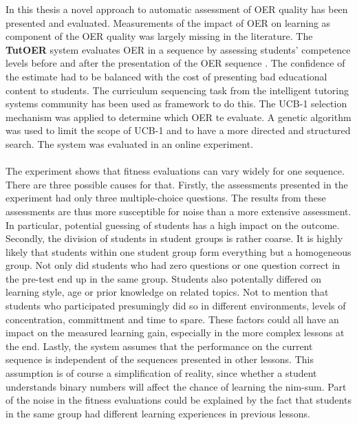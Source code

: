 In this thesis a novel approach to automatic assessment of OER quality has been
presented and evaluated. Measurements of the impact of OER on learning as
component of the OER quality was largely missing in the literature. The
\textbf{TutOER} system evaluates OER in a sequence by assessing students' competence levels
before and after the presentation of the OER sequence . The confidence of the estimate
had to be balanced with the cost of presenting bad educational content to
students. The curriculum sequencing task from the intelligent tutoring systems
community has been used as framework to do this. The UCB-1 selection mechanism
was applied to determine which OER te evaluate. A genetic algorithm was used
to limit the scope of UCB-1 and to have a more directed and structured
search. The system was evaluated in an online experiment.\\\\
\noindent
The experiment shows that fitness evaluations can vary widely for one
sequence. There are three possible causes for that. Firstly, the assessments
presented in the experiment had only three multiple-choice questions. The
results from these assessments are thus more susceptible for noise than a more
extensive assessment. In particular, potential guessing of students has a high
impact on the outcome. Secondly, the division of students in student groups is
rather coarse. It is highly likely that students within one student group form
everything but a homogeneous group. Not only did students who had zero
questions or one question correct in the pre-test end up in the same group.
Students also potentally differed on learning style, age or prior knowledge on
related topics. Not to mention that students who participated presumingly did
so in different environments, levels of concentration, committment and time to
spare. These factors could all have an impact on the measured learning gain,
especially in the more complex lessons at the end. Lastly, the system assumes
that the performance on the current sequence is independent of the sequences
presented in other lessons. This assumption is of course a simplification of
reality, since whether a student understands binary numbers will affect the
chance of learning the nim-sum. Part of the noise in the fitness evaluations
could be explained by the fact that students in the same group had different
learning experiences in previous lessons.\\\\
